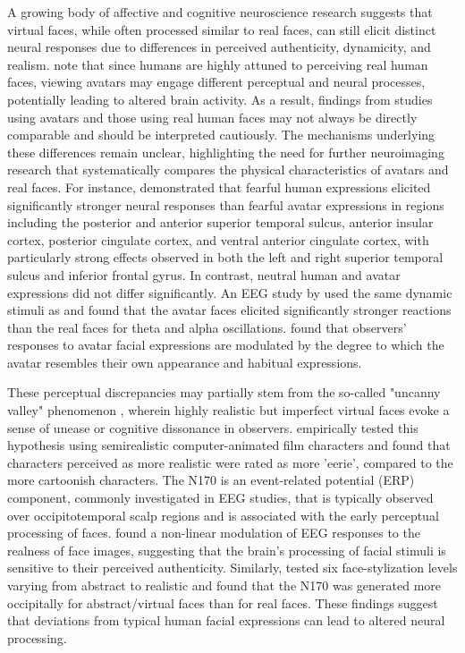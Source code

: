 A growing body of affective and cognitive neuroscience research suggests that virtual faces, while often processed similar to real faces, can still elicit distinct neural responses due to differences in perceived authenticity, dynamicity, and realism.
\cite{de_borst_is_2015} note that since humans are highly attuned to perceiving real human faces, viewing avatars may engage different perceptual and neural processes, potentially leading to altered brain activity. 
As a result, findings from studies using avatars and those using real human faces may not always be directly comparable and should be interpreted cautiously. 
The mechanisms underlying these differences remain unclear, highlighting the need for further neuroimaging research that systematically compares the physical characteristics of avatars and real faces.
For instance, \cite{kegel_dynamic_2020} demonstrated that fearful human expressions elicited significantly stronger neural responses than fearful avatar expressions in regions including the posterior and anterior superior temporal sulcus, anterior insular cortex, posterior cingulate cortex, and ventral anterior cingulate cortex, with particularly strong effects observed in both the left and right superior temporal sulcus and inferior frontal gyrus. 
In contrast, neutral human and avatar expressions did not differ significantly.
An EEG study by \cite{sollfrank_effects_2021} used the same dynamic stimuli as \cite{kegel_dynamic_2020} and found that the avatar faces elicited significantly stronger reactions than the real faces for theta and alpha oscillations.
\cite{park_individuals_2021} found that observers' responses to avatar facial expressions are modulated by the degree to which the avatar resembles their own appearance and habitual expressions.

These perceptual discrepancies may partially stem from the so-called "uncanny valley" phenomenon \citep{mori_uncanny_2012}, wherein highly realistic but imperfect virtual faces evoke a sense of unease or cognitive dissonance in observers. 
\cite{katsyri_testing_2017} empirically tested this hypothesis using semirealistic computer-animated film characters and found that characters perceived as more realistic were rated as more 'eerie', compared to the more cartoonish characters. 
The N170 is an event-related potential (ERP) component, commonly investigated in EEG studies, that is typically observed over occipitotemporal scalp regions and is associated with the early perceptual processing of faces.
\cite{chen_realness_2024} found a non-linear modulation of EEG responses to the realness of face images, suggesting that the brain's processing of facial stimuli is sensitive to their perceived authenticity.
Similarly, \cite{schindler_differential_2017} tested six face-stylization levels varying from abstract to realistic and found that the N170 was generated more occipitally for abstract/virtual faces than for real faces. 
These findings suggest that deviations from typical human facial expressions can lead to altered neural processing. 

